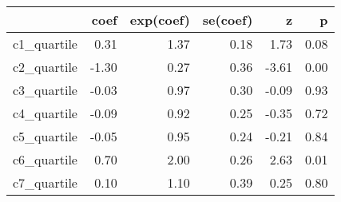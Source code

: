 \documentclass{article}
\begin{document}


\begin{table}[ht]
\centering
\begin{tabular}{rrrrrr}
  \hline
 & coef & exp(coef) & se(coef) & z & p \\
  \hline
c1\_quartile & 0.31 & 1.37 & 0.18 & 1.73 & 0.08 \\
  c2\_quartile & -1.30 & 0.27 & 0.36 & -3.61 & 0.00 \\
  c3\_quartile & -0.03 & 0.97 & 0.30 & -0.09 & 0.93 \\
  c4\_quartile & -0.09 & 0.92 & 0.25 & -0.35 & 0.72 \\
  c5\_quartile & -0.05 & 0.95 & 0.24 & -0.21 & 0.84 \\
  c6\_quartile & 0.70 & 2.00 & 0.26 & 2.63 & 0.01 \\
  c7\_quartile & 0.10 & 1.10 & 0.39 & 0.25 & 0.80 \\
   \hline
\end{tabular}
\end{table}
\end{document}

